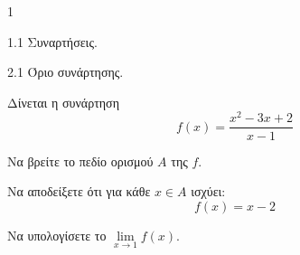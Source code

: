 \begin{ylh}{1}
    \item 1.1 Συναρτήσεις.
    \item 2.1 Όριο συνάρτησης.
\end{ylh}
Δίνεται η συνάρτηση
\[ f(x) = \frac{x^2 - 3x + 2}{x-1} \]
\begin{alist}
    \item Να βρείτε το πεδίο ορισμού $A$ της $f$. 
    \item Να αποδείξετε ότι για κάθε $x \in A$ ισχύει:
    \[ f(x) = x-2 \]
    \item Να υπολογίσετε το $\lim\limits_{x \to 1} f(x)$. 
\end{alist}

